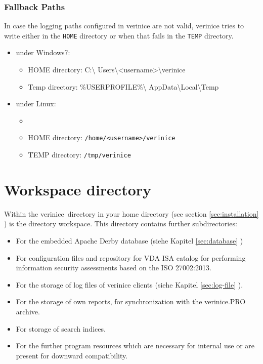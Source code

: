 \documentclass[a4paper,10pt]{book}
\begin{document}
\subsubsection{Fallback Paths}
\label{sec:fallback-path}

In case the logging paths configured in verinice are not valid,
verinice tries to write either in the \texttt{HOME} directory or when
that fails in the \texttt{TEMP} directory.

\begin{itemize}
\item under Windows7:
  \begin{itemize}
  \item HOME directory: C:\textbackslash
    Users\textbackslash<username>\textbackslash verinice
  \item Temp directory: \%USERPROFILE\%\textbackslash
    AppData\textbackslash Local\textbackslash Temp
  \end{itemize}
\item  under Linux:
  \begin{itemize}
  \item \item HOME directory: \texttt{/home/<username>/verinice}
  \item TEMP directory: \texttt{/tmp/verinice}
  \end{itemize}

\end{itemize}

\section{Workspace directory}
\label{sec:workspace-directory}
Within the \grqq verinice\grqq\ directory in your home directory (see section \ref{sec:installation} ) is the directory workspace.
This directory contains further subdirectories:
\begin{itemize}
\item For the embedded Apache Derby database (siehe Kapitel \ref{sec:database} )
\item For configuration files and repository for VDA ISA catalog for performing information security assessments based on the ISO 27002:2013.
\item For the storage of log files of verinice clients (siehe Kapitel \ref{sec:log-file} ).
\item For the storage of own reports, for synchronization with the verinice.PRO archive.
\item For storage of search indices.
\item For the further program resources which are necessary for internal use or are present for downward compatibility.
\end{itemize}
\end{document}
